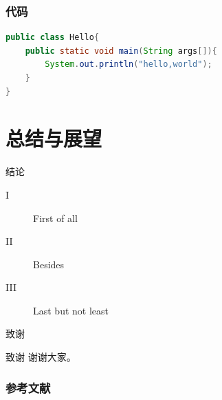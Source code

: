 \documentclass[hyperref,UTF8,11pt]{beamer}
\begin{document}
\begin{frame}[fragile]
    \frametitle{代码}
    \begin{lstlisting}[language=java]
public class Hello{
    public static void main(String args[]){
        System.out.println("hello,world");
    }
}\end{lstlisting}
\end{frame}

\section{总结与展望}

\begin{frame}{结论}
    \begin{description}
        \item[I] First of all
        \item[II] Besides
        \item[III] Last but not least
    \end{description}
\end{frame}

\begin{frame}{致谢}
    \begin{block}{致谢}
        谢谢大家。
    \end{block}
\end{frame}

\begin{frame}[allowframebreaks]
    \frametitle{参考文献}
    \printbibliography
\end{frame}
\end{document}
